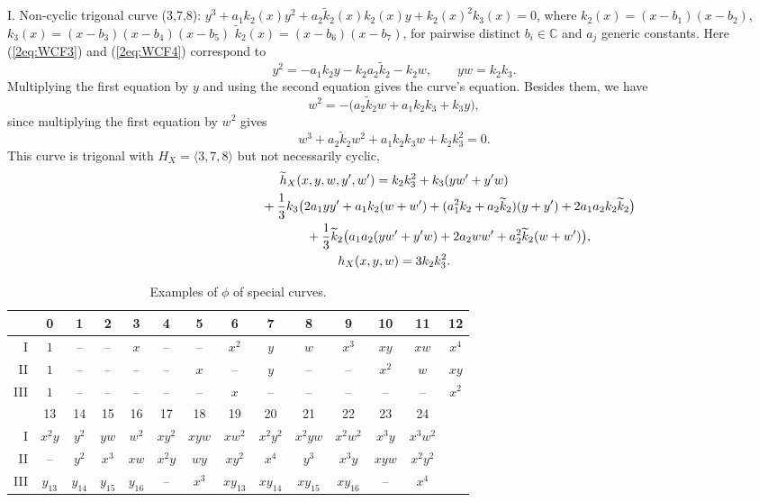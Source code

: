 \documentclass[pdftex]{sigma}
\def\CC{{\mathbb C}}
\def\th{{\widetilde h}}
\def\tk{{\widetilde k}}
\numberwithin{equation}{section}
\begin{document}
I. Non-cyclic trigonal curve (3,7,8):
$y^3 + a_1 k_2(x) y^2
+ a_2\tk_2(x) k_2(x) y +k_2(x)^2 k_3(x)=0$,
where $k_2(x) = (x-b_1)(x-b_2)$,
$k_3(x) = (x-b_3)(x-b_4)(x-b_5)$
$\tk_2(x) = (x-b_6)(x-b_7)$, for pairwise distinct $b_i\in \CC$ and $a_j$ generic constants.
Here (\ref{2eq:WCF3}) and (\ref{2eq:WCF4}) correspond to
\[
y^2 = -a_1k_2 y - k_2 a_2\tk_2 - k_2 w, \qquad
y w = k_2 k_3.
\]
Multiplying the first equation by $y$ and using the second equation gives the curve's equation.
Besides them, we have
\[
w^2 = -\big( a_2\tk_2 w + a_1k_2 k_3 + k_3y\big),
\]
since multiplying the first equation by $w^2$ gives
\[
w^3 + a_2\tk_2 w^2 + a_1k_2 k_3 w + k_2 k_3^2=0.
\]
This curve is trigonal with $H_X=\langle 3,7,8\rangle$ but not necessarily cyclic,
\begin{gather*}
\th_X(x, y, w, y', w')=k_2 k_3^2 + k_3(y w'+ y' w)\\
\hphantom{\th_X(x, y, w, y', w')=}{} + \frac{1}{3} k_3\big(2 a_1 y y'+a_1 k_2 (w+w')+(a_1^2k_2+a_2 \tk_2)(y+y')+2a_1a_2k_2 \tk_2\big)\\
\hphantom{\th_X(x, y, w, y', w')=}{} + \frac{1}{3}\tk_2\big(a_1a_2( y w'+y' w)+2a_2w w'+a_2^2 \tk_2(w+w')\big),\\
h_X(x,y, w) = 3k_2 k_3^2.
\end{gather*}

\begin{table}[t]\centering
	\caption{Examples of $\phi$ of special curves.}\vspace{1mm}
\renewcommand{\arraystretch}{1.3}\small
 \begin{tabular}{|r|ccccccccccccc|}
\hline
 &0&1&2&3&4&5&6&7&8&9&10&11&12\\
\hline
I&$1$&--&--&$x$&--&--&$x^2$&$y$&$w$&$x^3$&$xy$&$xw$&
 $x^4$\\
II&$1$&--&--&--&--&$x$&--&$y$&--&--&$x^2$&$w$&$xy$\\
III&$1$&--&--&--&--&--&$x$&--&--&--&--&--&$x^2$\\
\hline
\hline
&13&14&15&16& 17&18&19&20&21&22&23&24&\\
\hline
I&$x^2y$&$y^2$&$yw$&$w^2$&$xy^2$&$xyw$&$xw^2$&$x^2y^2$&
 $x^2yw$&$x^2w^2$&$x^3y$&$x^3w^2$&\\
II&--&$y^2$&$x^3$&$xw$&$x^2y$&$wy$&$xy^2$&$x^4$&$y^3$&$x^3y$&$xyw$&$x^2y^2$&\\
III&$y_{13}$&$y_{14}$&$y_{15}$&$y_{16}$
 &--&$x^3$&$xy_{13}$&$xy_{14}$&$xy_{15}$&$xy_{16}$&--&$x^4$&\\
\hline
 \end{tabular}
\end{table}
\end{document}
